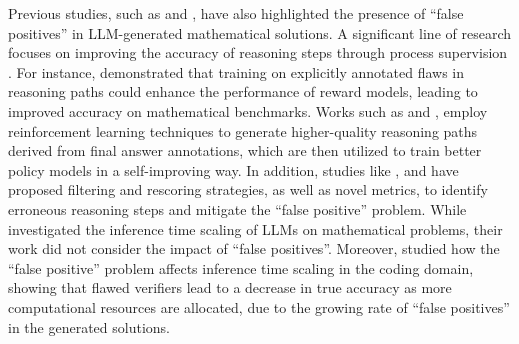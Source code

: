 Previous studies, such as \citet{hao2024llm} and \citet{zheng2024processbench}, have also highlighted the presence of ``false positives'' in LLM-generated mathematical solutions. A significant line of research focuses on improving the accuracy of reasoning steps through process supervision \cite{lightman2023let, setlur2024rewarding, luo2024improve}. For instance, \citet{lightman2023let} demonstrated that training on explicitly annotated flaws in reasoning paths could enhance the performance of reward models, leading to improved accuracy on mathematical benchmarks. Works such as \citet{luong2024reft} and \citet{shao2024deepseekmath}, employ reinforcement learning techniques to generate higher-quality reasoning paths derived from final answer annotations, which are then utilized to train better policy models in a self-improving way. In addition, studies like \citet{golovneva2022roscoe}, \citet{prasad2023receval} and \citet{xia2024evaluating} have proposed filtering and rescoring strategies, as well as novel metrics, to identify erroneous reasoning steps and mitigate the ``false positive'' problem. While \citet{snell2024scaling} investigated the inference time scaling of LLMs on mathematical problems, their work did not consider the impact of ``false positives''. Moreover, \citet{stroebl2024inference} studied how the ``false positive'' problem affects inference time scaling in the coding domain, showing that flawed verifiers lead to a decrease in true accuracy as more computational resources are allocated, due to the growing rate of ``false positives'' in the generated solutions.